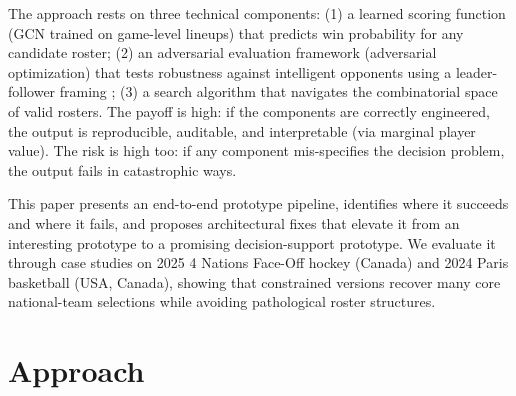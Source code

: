 \documentclass[11pt,letterpaper]{article}
\begin{document}
The approach rests on three technical components: (1) a learned
scoring function (GCN trained on game-level lineups) that predicts
win probability for any candidate roster; (2) an adversarial
evaluation framework (adversarial optimization) that tests robustness
against intelligent opponents using a leader-follower framing
\citep{conitzer2006commit}; (3) a search algorithm that navigates the
combinatorial space of valid rosters. The payoff is high: if the
components are correctly engineered, the output is reproducible,
auditable, and interpretable (via marginal player value). The risk is
high too: if any component mis-specifies the decision problem, the
output fails in catastrophic ways.

This paper presents an end-to-end prototype pipeline, identifies where
it succeeds and where it fails, and proposes architectural fixes that elevate it
from an interesting prototype to a promising decision-support
prototype. We evaluate it through case studies on 2025 4 Nations
Face-Off hockey (Canada) and 2024 Paris basketball (USA, Canada),
showing that constrained versions recover many core national-team
selections while avoiding pathological roster structures.

\section{Approach}
\label{sec:approach}
\end{document}
